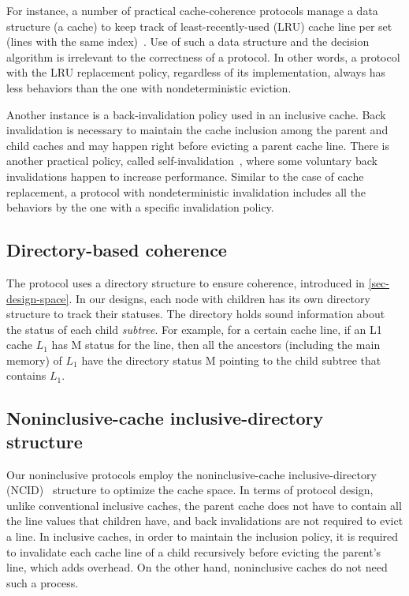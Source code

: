 For instance, a number of practical cache-coherence protocols manage a data structure (a cache) to keep track of least-recently-used (LRU) cache line per set (lines with the same index)~\cite{cacheLRU}.
Use of such a data structure and the decision algorithm is irrelevant to the correctness of a protocol.
In other words, a protocol with the LRU replacement policy, regardless of its implementation, always has less behaviors than the one with nondeterministic eviction.

Another instance is a back-invalidation policy used in an inclusive cache.
Back invalidation is necessary to maintain the cache inclusion among the parent and child caches and may happen right before evicting a parent cache line.
There is another practical policy, called self-invalidation~\cite{Ros:2012}, where some voluntary back invalidations happen to increase performance.
Similar to the case of cache replacement, a protocol with nondeterministic invalidation includes all the behaviors by the one with a specific invalidation policy.

\subsection{Directory-based coherence}
\label{sec-dir-based}

The protocol uses a directory structure to ensure coherence, introduced in \autoref{sec-design-space}.
In our designs, each node with children has its own directory structure to track their statuses.
The directory holds sound information about the status of each child \emph{subtree}.
For example, for a certain cache line, if an L1 cache $L_1$ has M status for the line, then all the ancestors (including the main memory) of $L_1$ have the directory status M pointing to the child subtree that contains $L_1$.

\subsection{Noninclusive-cache inclusive-directory structure}
\label{sec-ncid}

Our noninclusive protocols employ the noninclusive-cache inclusive-directory (NCID)~\cite{Zhao:2010} structure to optimize the cache space.
In terms of protocol design, unlike conventional inclusive caches, the parent cache does not have to contain all the line values that children have, and back invalidations are not required to evict a line.
In inclusive caches, in order to maintain the inclusion policy, it is required to invalidate each cache line of a child recursively before evicting the parent's line, which adds overhead.
On the other hand, noninclusive caches do not need such a process.

